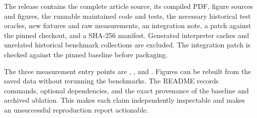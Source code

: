 The release contains the complete article source, its compiled PDF, figure
sources and figures, the runnable maintained  code and tests,
the necessary historical test oracles, new fixtures and raw measurements,
an integration note, a patch against the pinned checkout, and a SHA-256
manifest. Generated interpreter caches and unrelated historical benchmark
collections are excluded. The integration patch is checked against the
pinned baseline before packaging.

The three measurement entry points are
,
, and
.
Figures can be rebuilt from the saved data without rerunning the benchmarks.
The README records commands, optional dependencies, and the exact provenance
of the baseline and archived ablation. This makes each claim independently
inspectable and makes an unsuccessful reproduction report actionable.
